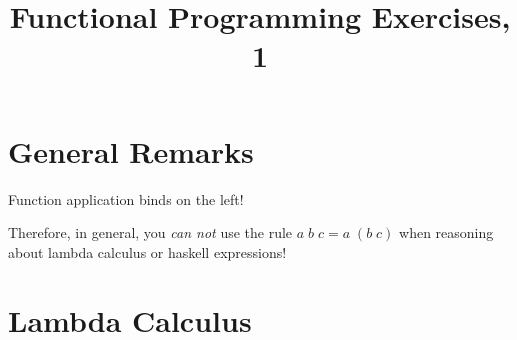 \documentclass{article}
\title{Functional Programming Exercises, 1}
\newcommand{\Varid}[1]{\mathit{#1}}
\begin{document}
\maketitle

\section{General Remarks}

Function application binds on the left!

Therefore, in general, you {\em can not} use the rule
\ensuremath{\Varid{a}\;\Varid{b}\;\Varid{c}\mathrel{=}\Varid{a}\;(\Varid{b}\;\Varid{c})}
when reasoning about lambda calculus or haskell expressions!

\section{Lambda Calculus}

\end{document}
